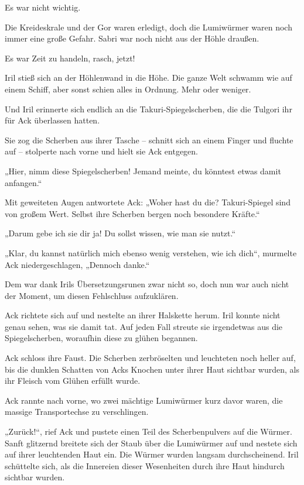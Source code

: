 Es war nicht wichtig.

Die Kreideskrale und der Gor waren erledigt, doch die Lumiwürmer waren noch immer eine große Gefahr. Sabri war noch nicht aus der Höhle draußen.

Es war Zeit zu handeln, rasch, jetzt!

Iril stieß sich an der Höhlenwand in die Höhe. Die ganze Welt schwamm wie auf einem Schiff, aber sonst schien alles in Ordnung. Mehr oder weniger.

Und Iril erinnerte sich endlich an die Takuri-Spiegelscherben, die die Tulgori ihr für Ack überlassen hatten.

Sie zog die Scherben aus ihrer Tasche – schnitt sich an einem Finger und fluchte auf – stolperte nach vorne und hielt sie Ack entgegen.

„Hier, nimm diese Spiegelscherben! Jemand meinte, du könntest etwas damit anfangen.“

Mit geweiteten Augen antwortete Ack: „Woher hast du die? Takuri-Spiegel sind von großem Wert. Selbst ihre Scherben bergen noch besondere Kräfte.“

„Darum gebe ich sie dir ja! Du sollst wissen, wie man sie nutzt.“

„Klar, du kannst natürlich mich ebenso wenig verstehen, wie ich dich“, murmelte Ack niedergeschlagen, „Dennoch danke.“

Dem war dank Irils Übersetzungsrunen zwar nicht so, doch nun war auch nicht der Moment, um diesen Fehlschluss aufzuklären.

Ack richtete sich auf und nestelte an ihrer Halskette herum. Iril konnte nicht genau sehen, was sie damit tat. Auf jeden Fall streute sie irgendetwas aus die Spiegelscherben, woraufhin diese zu glühen begannen.

Ack schloss ihre Faust. Die Scherben zerbröselten und leuchteten noch heller auf, bis die dunklen Schatten von Acks Knochen unter ihrer Haut sichtbar wurden, als ihr Fleisch vom Glühen erfüllt wurde.

Ack rannte nach vorne, wo zwei mächtige Lumiwürmer kurz davor waren, die massige Transportechse zu verschlingen.

„Zurück!“, rief Ack und pustete einen Teil des Scherbenpulvers auf die Würmer. Sanft glitzernd breitete sich der Staub über die Lumiwürmer auf und nestete sich auf ihrer leuchtenden Haut ein. Die Würmer wurden langsam durchscheinend. Iril schüttelte sich, als die Innereien dieser Wesenheiten durch ihre Haut hindurch sichtbar wurden.

